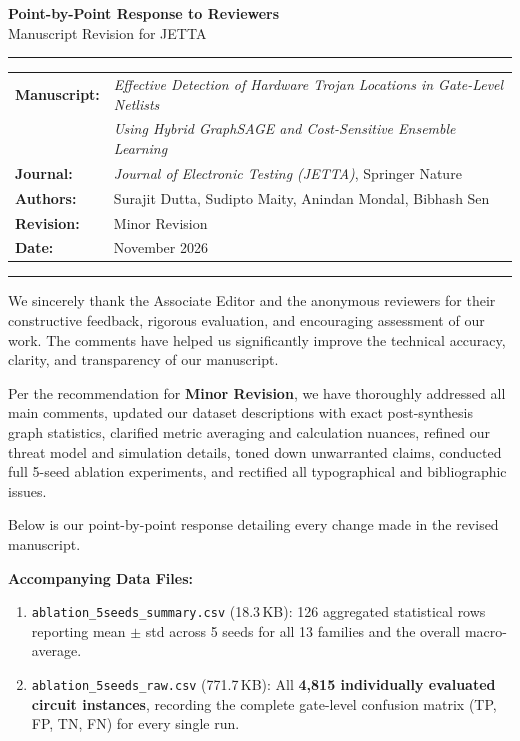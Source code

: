 \documentclass[11pt,a4paper]{article}
\begin{document}
\begin{center}
    {\LARGE \textbf{Point-by-Point Response to Reviewers}}\\[6pt]
    {\Large Manuscript Revision for JETTA}\\[10pt]
    \rule{\textwidth}{1.2pt}
\end{center}

\vspace{-4pt}
\begin{tabular}{@{}ll@{}}
    \textbf{Manuscript:} & \textit{Effective Detection of Hardware Trojan Locations in Gate-Level Netlists} \\
    & \textit{Using Hybrid GraphSAGE and Cost-Sensitive Ensemble Learning} \\
    \textbf{Journal:} & \textit{Journal of Electronic Testing (JETTA)}, Springer Nature \\
    \textbf{Authors:} & Surajit Dutta, Sudipto Maity, Anindan Mondal, Bibhash Sen \\
    \textbf{Revision:} & Minor Revision \\
    \textbf{Date:} & November 2026 \\
\end{tabular}
\vspace{4pt}
\rule{\textwidth}{0.8pt}

\vspace{8pt}
\noindent We sincerely thank the Associate Editor and the anonymous reviewers for their constructive feedback, rigorous evaluation, and encouraging assessment of our work. The comments have helped us significantly improve the technical accuracy, clarity, and transparency of our manuscript.

Per the recommendation for \textbf{Minor Revision}, we have thoroughly addressed all main comments, updated our dataset descriptions with exact post-synthesis graph statistics, clarified metric averaging and calculation nuances, refined our threat model and simulation details, toned down unwarranted claims, conducted full 5-seed ablation experiments, and rectified all typographical and bibliographic issues.

Below is our point-by-point response detailing every change made in the revised manuscript.

\textbf{Accompanying Data Files:}
\begin{enumerate}[leftmargin=*]
    \item \texttt{ablation\_5seeds\_summary.csv} (18.3\,KB): 126 aggregated statistical rows reporting mean $\pm$ std across 5 seeds for all 13 families and the overall macro-average.
    \item \texttt{ablation\_5seeds\_raw.csv} (771.7\,KB): All \textbf{4,815 individually evaluated circuit instances}, recording the complete gate-level confusion matrix (TP, FP, TN, FN) for every single run.
\end{enumerate}
\end{document}
